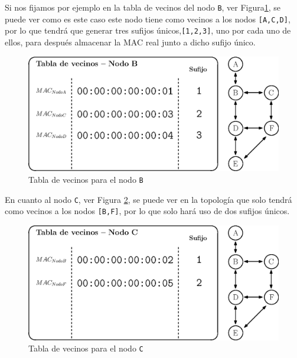 Si nos fijamos por ejemplo en la tabla de vecinos del nodo \texttt{B}, ver Figura\ref{fig:topo_hello_nodoB_nb}, se puede ver como es este caso este nodo tiene como vecinos a los nodos \texttt{[A,C,D]}, por lo que tendrá que generar tres sufijos únicos,\texttt{[1,2,3]}, uno por cada uno de ellos, para después almacenar la MAC real junto a dicho sufijo único.\\

\begin{figure}[ht!]
    \centering
    \includegraphics[width=\textwidth]{archivos/img/dev/topo_hello_nodoB_nb.eps}
    \caption{Tabla de vecinos para el nodo \texttt{B}}
    \label{fig:topo_hello_nodoB_nb}
\end{figure}

En cuanto al nodo \texttt{C}, ver Figura \ref{fig:topo_hello_nodoC_nb}, se puede ver en la topología que solo tendrá como vecinos a los nodos \texttt{[B,F]}, por lo que solo hará uso de dos sufijos únicos.\\

\begin{figure}[ht!]
    \centering
    \includegraphics[width=\textwidth]{archivos/img/dev/topo_hello_nodoC_nb.eps}
    \caption{Tabla de vecinos para el nodo \texttt{C}}
    \label{fig:topo_hello_nodoC_nb}
\end{figure}

